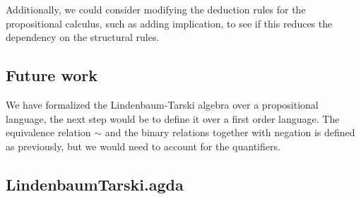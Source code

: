 \documentclass[titlepage]{article}
\begin{document}
Additionally, we could consider modifying the deduction rules for the propositional calculus, such as adding implication, to see if this reduces the dependency on the structural rules.


\subsection{Future work}
We have formalized the Lindenbaum-Tarski algebra over a propositional language, the next step would be to define it over a first order language. The equivalence relation $\sim$ and the binary relations together with negation is defined as previously, but we would need to account for the quantifiers.












\newpage


\newpage
\begin{appendices}
    \section{LindenbaumTarski.agda}\label{code}
\end{appendices}
\end{document}
